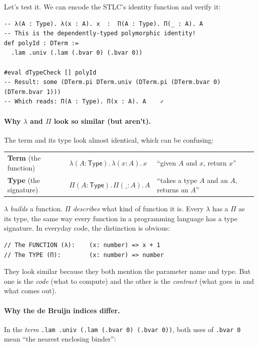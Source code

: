 \documentclass[11pt,a4paper]{article}
\theoremstyle{definition}
\newcommand{\lam}{\lambda}
\begin{document}
Let's test it. We can encode the STLC's identity function and verify it:

\begin{verbatim}
-- λ(A : Type). λ(x : A). x  :  Π(A : Type). Π(_ : A). A
-- This is the dependently-typed polymorphic identity!
def polyId : DTerm :=
  .lam .univ (.lam (.bvar 0) (.bvar 0))

#eval dTypeCheck [] polyId
-- Result: some (DTerm.pi DTerm.univ (DTerm.pi (DTerm.bvar 0) (DTerm.bvar 1)))
-- Which reads: Π(A : Type). Π(x : A). A    ✓
\end{verbatim}

\paragraph{Why $\lambda$ and $\Pi$ look so similar (but aren't).}
The term and its type look almost identical, which can be confusing:
\begin{center}
\renewcommand{\arraystretch}{1.3}
\begin{tabular}{lll}
\textbf{Term} (the function) & $\lam(A : \textsf{Type}).\, \lam(x : A).\, x$
  & ``given $A$ and $x$, return $x$'' \\
\textbf{Type} (the signature) & $\Pi(A : \textsf{Type}).\, \Pi(\_ : A).\, A$
  & ``takes a type $A$ and an $A$, returns an $A$'' \\
\end{tabular}
\end{center}

$\lambda$ \emph{builds} a function. $\Pi$ \emph{describes} what kind of
function it is. Every $\lambda$ has a $\Pi$ as its type, the same way every
function in a programming language has a type signature. In everyday code, the
distinction is obvious:
\begin{verbatim}
// The FUNCTION (λ):    (x: number) => x + 1
// The TYPE (Π):        (x: number) => number
\end{verbatim}
They look similar because they both mention the parameter name and type. But
one is the \emph{code} (what to compute) and the other is the \emph{contract}
(what goes in and what comes out).

\paragraph{Why the de Bruijn indices differ.}
In the \emph{term} \texttt{.lam .univ (.lam (.bvar 0) (.bvar 0))}, both uses
of \texttt{.bvar 0} mean ``the nearest enclosing binder'':
\end{document}
